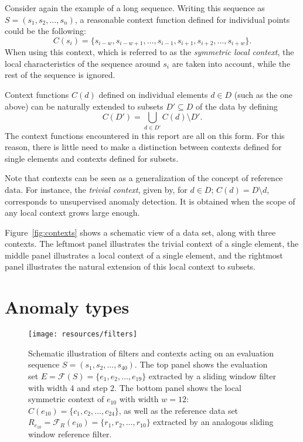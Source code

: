 Consider again the example of a long sequence. Writing this sequence as $S = (s_1, s_2, \dots, s_n)$, a reasonable context function defined for individual points could be the following:
\[
    C(s_i) = \{s_{i-w}, s_{i - w + 1}, \dots, s_{i - 1}, s_{i + 1}, s_{i + 2}, \dots, s_{i + w}\}.
\]
When using this context, which is referred to as the \emph{symmetric local context}, the local characteristics of the sequence around $s_i$ are taken into account, while the rest of the sequence is ignored.

Context functions $C(d)$ defined on individual elements $d \in D$ (such as the one above) can be naturally extended to subsets $D' \subseteq D$ of the data by defining
\[
    C(D') = \bigcup_{d \in D'} C(d) \setminus D'.
\]
The context functions encountered in this report are all on this form. For this reason, there is little need to make a distinction between contexts defined for single elements and contexts defined for subsets.

Note that contexts can be seen as a generalization of the concept of reference data. For instance, the \emph{trivial context}, given by, for $d \in D$; $C(d) = D \setminus d$, corresponds to unsupervised anomaly detection. It is obtained when the scope of any local context grows large enough.

Figure~\ref{fig:contexts} shows a schematic view of a data set, along with three contexts. The leftmost panel illustrates the trivial context of a single element, the middle panel illustrates a local context of a single element, and the rightmost panel illustrates the natural extension of this local context to subsets.

\section{Anomaly types}
\label{sect:anomaly_types}

\begin{figure}[htb]
    \begin{center}
        \texttt{[image: resources/filters]}
    \end{center}
    \caption{{\small Schematic illustration of filters and contexts acting on an evaluation sequence $S = (s_1, s_2, \dots, s_{40})$. The top panel shows the evaluation set $E = \mathcal{F}(S) = \{e_1, e_2, \dots, e_{19}\}$ extracted by a sliding window filter with width $4$ and step $2$. The bottom panel shows the local symmetric context of $e_{10}$ with width $w = 12$: $C(e_{10}) = \{c_1, c_2, \dots, c_{24}\}$, as well as the reference data set $R_{e_{10}} = \mathcal{F}_R(e_{10}) = \{r_1, r_2, \dots, r_{10}\}$ extracted by an analogous sliding window reference filter.}}
\label{fig:filters}
\end{figure}

